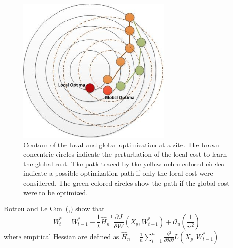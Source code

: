 \begin{figure}[h]
\centerline{\includegraphics[width=0.68\textwidth]{contours.jpg}}
\caption{Contour of the local and global optimization at a site. The brown concentric circles indicate the perturbation of the local cost to learn the global cost. The path traced by the yellow ochre colored circles indicate a possible optimization path if only the local cost were considered. The green colored circles show the path if the global cost were to be optimized. }
\label{convergence}
\end{figure}

Bottou and Le Cun~(\cite{Bottou_05},\cite{lecun-98a}) show that 
\begin{equation}
W^{*}_t = W^{*}_{t-1} - \frac{1}{t} \hat{H}_n^{-1} \frac{\partial J}{\partial W} (X_p,W^{*}_{t-1} ) + \mathcal{O}_u(\frac{1}{n^2})
\end{equation}
where empirical Hessian are defined as $\hat{H}_n = \frac{1}{n} \sum_{i=1}^{n} \frac{\partial^{2}}{\partial \theta \partial \theta} L(X_p, W^{*}_{t-1}) $

%


